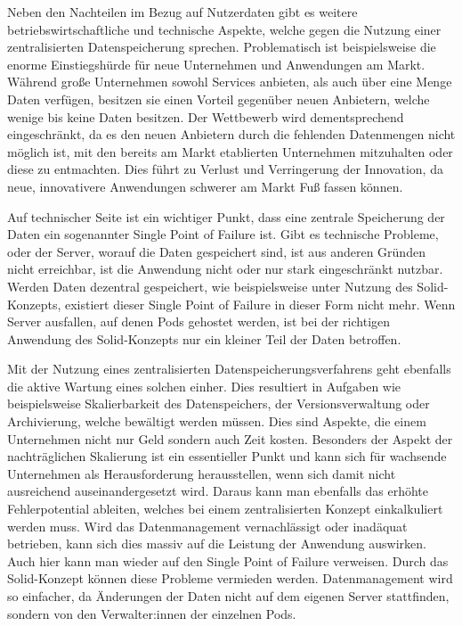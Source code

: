 \documentclass[acmtog]{acmart}
\begin{document}
Neben den Nachteilen im Bezug auf Nutzerdaten gibt es weitere betriebswirtschaftliche und technische Aspekte, welche gegen die Nutzung einer zentralisierten Datenspeicherung sprechen. Problematisch ist beispielsweise die enorme Einstiegshürde für neue Unternehmen und Anwendungen am Markt. Während große Unternehmen sowohl Services anbieten, als auch über eine Menge Daten verfügen, besitzen sie einen Vorteil gegenüber neuen Anbietern, welche wenige bis keine Daten besitzen. Der Wettbewerb wird dementsprechend eingeschränkt, da es den neuen Anbietern durch die fehlenden Datenmengen nicht möglich ist, mit den bereits am Markt etablierten Unternehmen mitzuhalten oder diese zu entmachten. Dies führt zu Verlust und Verringerung der Innovation, da neue, innovativere Anwendungen schwerer am Markt Fuß fassen können.

Auf technischer Seite ist ein wichtiger Punkt, dass eine zentrale Speicherung der Daten ein sogenannter Single Point of Failure ist. Gibt es technische Probleme, oder der Server, worauf die Daten gespeichert sind, ist aus anderen Gründen nicht erreichbar, ist die Anwendung nicht oder nur stark eingeschränkt nutzbar. Werden Daten dezentral gespeichert, wie beispielsweise unter Nutzung des Solid-Konzepts, existiert dieser Single Point of Failure in dieser Form nicht mehr. Wenn Server ausfallen, auf denen Pods gehostet werden, ist bei der richtigen Anwendung des Solid-Konzepts nur ein kleiner Teil der Daten betroffen.

Mit der Nutzung eines zentralisierten Datenspeicherungsverfahrens geht ebenfalls die aktive Wartung eines solchen einher. Dies resultiert in Aufgaben wie beispielsweise Skalierbarkeit des Datenspeichers, der Versionsverwaltung oder Archivierung, welche bewältigt werden müssen. Dies sind Aspekte, die einem Unternehmen nicht nur Geld sondern auch Zeit kosten. Besonders der Aspekt der nachträglichen Skalierung ist ein essentieller Punkt und kann sich für wachsende Unternehmen als Herausforderung herausstellen, wenn sich damit nicht ausreichend auseinandergesetzt wird.
Daraus kann man ebenfalls das erhöhte Fehlerpotential ableiten, welches bei einem zentralisierten Konzept einkalkuliert werden muss. Wird das Datenmanagement vernachlässigt oder inadäquat betrieben, kann sich dies massiv auf die Leistung der Anwendung auswirken. Auch hier kann man wieder auf den Single Point of Failure verweisen. Durch das Solid-Konzept können diese Probleme vermieden werden. Datenmanagement wird so einfacher, da Änderungen der Daten nicht auf dem eigenen Server stattfinden, sondern von den Verwalter:innen der einzelnen Pods. 
\end{document}
